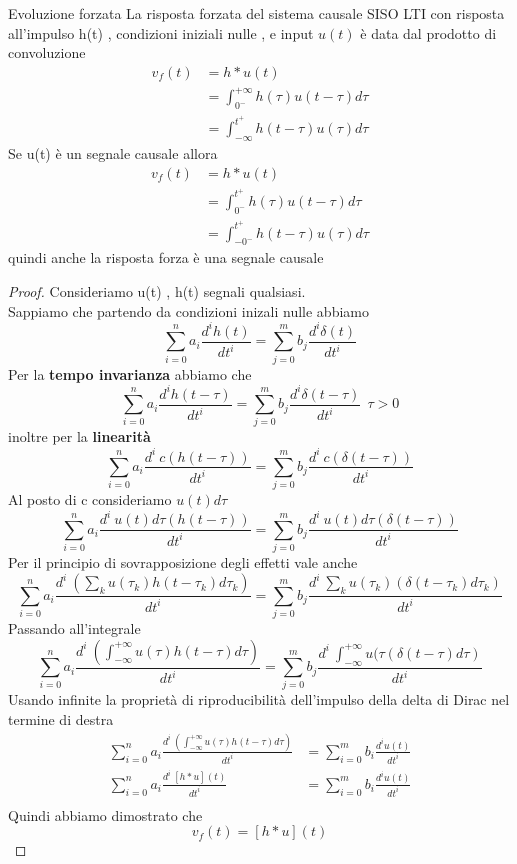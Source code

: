 \documentclass{article}
\theoremstyle{definition}
\newcommand{\intinf}{\int_{-\infty}^{+\infty}}
\begin{document}
	\begin{teo}{Evoluzione forzata}{}
		La risposta forzata del sistema causale SISO LTI con risposta all'impulso h(t) , condizioni iniziali nulle , e input $u(t)$ è data dal prodotto di convoluzione 
	\begin{align*}
		v_f(t)&=h*u(t)\\
		&=\int_{0^-}^{+\infty}h(\tau)u(t-\tau) d\tau\\
		&=\int_{-\infty}^{t^+} h(t-\tau)u(\tau)d\tau
	\end{align*}
		Se u(t) è un segnale causale allora
			\begin{align*}
			v_f(t)&=h*u(t)\\
			&=\int_{0^-}^{t^+}h(\tau)u(t-\tau) d\tau\\
			&=\int_{-0^-}^{t^+} h(t-\tau)u(\tau)d\tau
		\end{align*}
		quindi anche la risposta forza è una segnale causale 
		\end{teo}
		\begin{proof}
			Consideriamo u(t) , h(t) segnali qualsiasi.\\
			Sappiamo che partendo da condizioni inizali nulle abbiamo 
				$$\sum_{i=0}^{n}a_i \frac{d^i h(t)}{dt^i}=\sum_{j=0}^{m}b_j \frac{d^i \delta(t)}{dt^i} $$
				Per la \textbf{tempo invarianza }abbiamo che 
				$$\sum_{i=0}^{n}a_i \frac{d^i h(t-\tau)}{dt^i}=\sum_{j=0}^{m}b_j \frac{d^i \delta(t-\tau)}{dt^i}  \ \ \tau > 0$$
				inoltre per la \textbf{linearità}
				$$\sum_{i=0}^{n}a_i \frac{d^i \ c (h(t-\tau))}{dt^i}=\sum_{j=0}^{m}b_j \frac{d^i \ c(\delta(t-\tau))}{dt^i} $$
				Al posto di c consideriamo $u(t)d\tau$
					$$\sum_{i=0}^{n}a_i \frac{d^i \ u(t)d\tau (h(t-\tau))}{dt^i}=\sum_{j=0}^{m}b_j \frac{d^i \ u(t)d\tau(\delta(t-\tau))}{dt^i} $$
					Per il principio di sovrapposizione degli effetti vale anche 
						$$\sum_{i=0}^{n}a_i \frac{d^i \  (\sum_k u(\tau_k)h(t-\tau_k)d\tau_k)}{dt^i}=\sum_{j=0}^{m}b_j \frac{d^i \ \sum_k u(\tau_k)(\delta(t-\tau_k)d\tau_k)}{dt^i} $$
						Passando all'integrale 
						$$\sum_{i=0}^{n}a_i \frac{d^i \  (\intinf u(\tau)h(t-\tau)d\tau)}{dt^i}=\sum_{j=0}^{m}b_j \frac{d^i \ \intinf u(\tau(\delta(t-\tau)d\tau)}{dt^i} $$
						Usando infinite la proprietà di riproducibilità dell'impulso della delta di Dirac nel termine di destra 
						\begin{align*}
							\sum_{i=0}^{n}a_i \frac{d^i \  (\intinf u(\tau)h(t-\tau)d\tau)}{dt^i}&=\sum_{i=0}^{m}b_i \frac{d^iu(t)}{dt^i}\\
								\sum_{i=0}^{n}a_i \frac{d^i \  [h*u](t)}{dt^i}&=\sum_{i=0}^{m}b_i \frac{d^iu(t)}{dt^i}\\
						\end{align*}
						Quindi abbiamo dimostrato che $$v_f(t)=[h*u](t)$$
		\end{proof}
\end{document}
